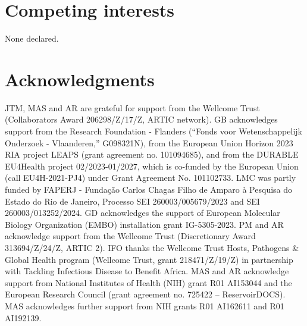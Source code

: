 \documentclass[11pt,a4paper]{article}
\begin{document}
\section*{Competing interests}
None declared.


\section*{Acknowledgments}
JTM, MAS and AR are grateful for support from the Wellcome Trust (Collaborators Award 206298/Z/17/Z, ARTIC network).
GB acknowledges support from the Research Foundation - Flanders (``Fonds voor Wetenschappelijk Onderzoek - Vlaanderen,'' G098321N), from the European Union Horizon 2023 RIA project LEAPS (grant agreement no. 101094685), and from the DURABLE EU4Health project 02/2023-01/2027, which is co-funded by the European Union (call EU4H-2021-PJ4) under Grant Agreement No. 101102733.
LMC was partly funded by FAPERJ - Fundação Carlos Chagas Filho de Amparo à Pesquisa do Estado do Rio de Janeiro, Processo SEI 260003/005679/2023 and SEI 260003/013252/2024.
GD acknowledges the support of European Molecular Biology Organization (EMBO) installation grant IG-5305-2023.
PM and AR acknowledge support from the Wellcome Trust (Discretionary Award 313694/Z/24/Z, ARTIC 2).
IFO thanks the Wellcome Trust Hosts, Pathogens \& Global Health program (Wellcome Trust, grant 218471/Z/19/Z) in partnership with Tackling Infectious Disease to Benefit Africa.
MAS and AR acknowledge support from National Institutes of Health (NIH) grant R01 AI153044 and the European Research Council (grant agreement no. 725422 -- ReservoirDOCS).
MAS acknowledges further support from NIH grants R01 AI162611 and R01 AI192139.

\pagebreak
\textbf{}

\printbibliography
\pagebreak


\end{document}
